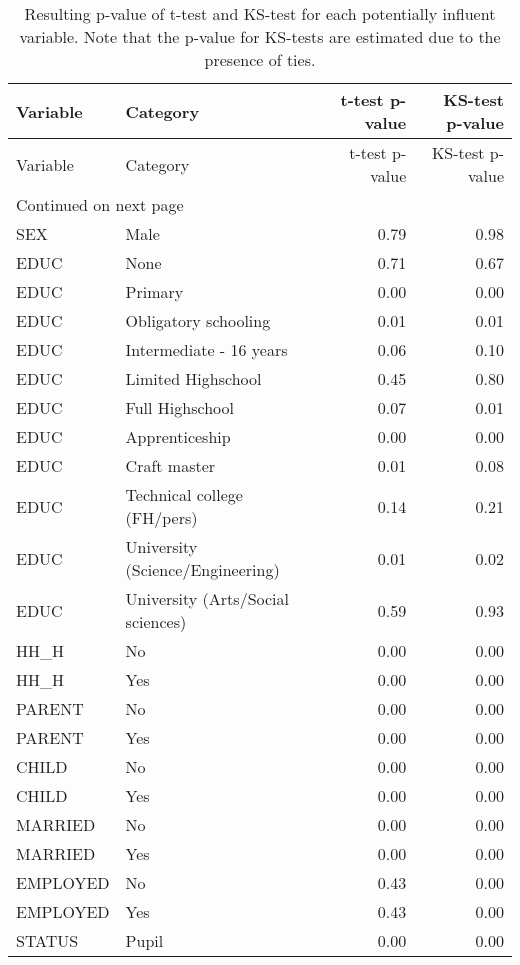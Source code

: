 \begin{longtable}{llrr}
\caption{Resulting p-value of t-test and KS-test for each potentially influent variable. Note that the p-value for KS-tests are estimated due to the presence of ties.} \\ 
  \hline
Variable & Category & t-test p-value & KS-test p-value \\ 
  \hline
\endfirsthead
\hline
Variable & Category & t-test p-value & KS-test p-value \\ 
\hline
\endhead
\hline
\multicolumn{4}{l}{\footnotesize Continued on next page}
\endfoot
\endlastfoot
 \hline
  SEX & Female & 0.79 & 0.98 \\ 
  SEX & Male & 0.79 & 0.98 \\ 
  EDUC & None & 0.71 & 0.67 \\ 
  EDUC & Primary & 0.00 & 0.00 \\ 
  EDUC & Obligatory schooling & 0.01 & 0.01 \\ 
  EDUC & Intermediate - 16 years & 0.06 & 0.10 \\ 
  EDUC & Limited Highschool & 0.45 & 0.80 \\ 
  EDUC & Full Highschool & 0.07 & 0.01 \\ 
  EDUC & Apprenticeship & 0.00 & 0.00 \\ 
  EDUC & Craft master & 0.01 & 0.08 \\ 
  EDUC & Technical college (FH/pers) & 0.14 & 0.21 \\ 
  EDUC & University (Science/Engineering) & 0.01 & 0.02 \\ 
  EDUC & University (Arts/Social sciences) & 0.59 & 0.93 \\ 
  HH\_H & No & 0.00 & 0.00 \\ 
  HH\_H & Yes & 0.00 & 0.00 \\ 
  PARENT & No & 0.00 & 0.00 \\ 
  PARENT & Yes & 0.00 & 0.00 \\ 
  CHILD & No & 0.00 & 0.00 \\ 
  CHILD & Yes & 0.00 & 0.00 \\ 
  MARRIED & No & 0.00 & 0.00 \\ 
  MARRIED & Yes & 0.00 & 0.00 \\ 
  EMPLOYED & No & 0.43 & 0.00 \\ 
  EMPLOYED & Yes & 0.43 & 0.00 \\ 
  STATUS & Pupil & 0.00 & 0.00 \\ 

\end{longtable}
